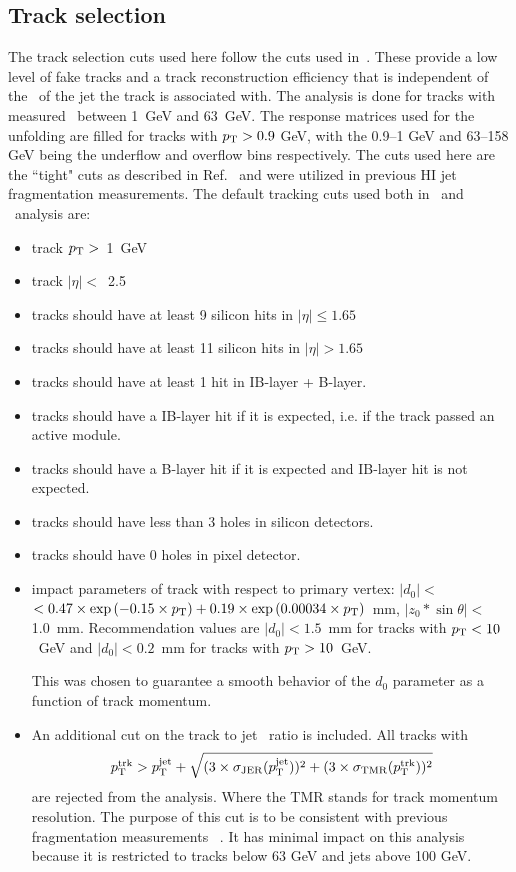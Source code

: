 \subsection{Track selection}
\label{sec:trackselection}

The track selection cuts used here follow the cuts used in~\cite{ATLAS502FFConf}. These provide a low level of fake tracks and 
a track reconstruction efficiency that is independent of the \pt\ of the jet the track is associated with.  
The analysis is done for tracks with measured \pt\ between 1~GeV and 63~GeV. The response matrices used for the unfolding are filled for tracks with $p_{\mathrm{T}} > 0.9$ GeV, with the 0.9--1 GeV and 63--158 GeV being the underflow and overflow bins respectively.
The cuts used here are the ``tight" cuts as described in Ref.~\cite{ref:tracktwiki} and were utilized in previous HI jet fragmentation measurements. The default tracking cuts used both in \pp\ and \PbPb\ analysis are:
\begin{itemize}
\item{ track $p_{\mathrm{T}}>$~1~GeV}
\item{ track $|\eta|<$~2.5}
\item{ tracks should have at least 9 silicon hits in $|\eta|\leq1.65$}
\item{ tracks should have at least 11 silicon hits in $|\eta|>1.65$}
\item{ tracks should have at least 1 hit in IB-layer + B-layer.}
\item{tracks should have a IB-layer hit if it is expected, i.e. if the track passed an active module.}
\item{tracks should have a B-layer hit if it is expected and IB-layer hit is not expected.}
\item{ tracks should have  less than 3 holes in silicon detectors.}
\item{ tracks should have 0 holes in pixel detector.}
\item{impact parameters of track with respect to primary vertex:  $|d_0|<$$< 0.47\times \exp{(-0.15\times\ensuremath{p_{\mathrm{T}}})} + 0.19\times \exp{(0.00034\times\ensuremath{p_{\mathrm{T}}})}$~mm, $|z_0*\sin\theta|<$1.0~mm. Recommendation values are  $|d_0| < 1.5$~mm for tracks with $p_{\mathrm{T}}<10$~GeV and $|d_0| < 0.2$~mm for tracks with $p_{\mathrm{T}}>10$~GeV.
  	
  	This was chosen to guarantee a smooth behavior of the $d_{0}$ parameter as a function of track momentum. }
\item{ An additional cut on the track to jet \pT\ ratio is included. All tracks with 
\begin{equation}
\mbox{$p_{{\mathrm{T}}}^{\mathrm{trk}}$} >  \mbox{$p_{\mathrm{T}}^{\mathrm{jet}}$} + \sqrt{ (3 \times \sigma_{\mathrm{JER}}(\mbox{$p_{\mathrm{T}}^{\mathrm{jet}}$}))^2 + (3 \times \sigma_{\mathrm{TMR}}(\mbox{$p_{{\mathrm{T}}}^{\mathrm{trk}}$}))^2} 
\end{equation}
are rejected from the analysis. Where the TMR stands for track momentum resolution. The purpose of this cut is to be consistent with previous fragmentation measurements ~\cite{ATLAS502FFConf}. It has minimal impact on this analysis because it is restricted to tracks below 63 GeV and jets above 100 GeV. }
\end{itemize}

